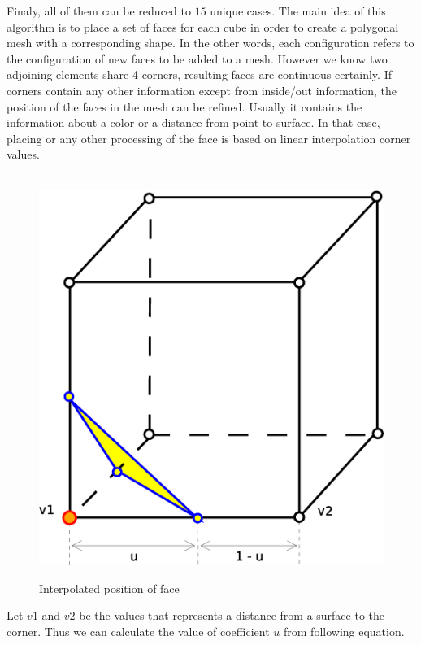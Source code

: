 Finaly, all of them can be reduced to $15$ unique cases. The main idea of this algorithm is to
place a set of faces for each cube in order to create a polygonal mesh with a corresponding shape.
In the other words, each configuration refers to the configuration of new faces to be added to a mesh.
However we know two adjoining elements share 4 corners, resulting faces are continuous certainly.
If corners contain any other information except from inside/out information, the position of 
the faces in the mesh can be refined. Usually it contains the information about a color or
a distance from point to surface. In that case, placing or any other processing of
the face is based on linear interpolation corner values.\\
\\

\begin{figure}[!htbp]
\centering
\includegraphics[scale=0.35]{../img/marc_cub_inter.eps}
\label{fig:mc_interpolation}
\caption{Interpolated position of face}
\end{figure}

Let $v1$ and $v2$ be the values that represents a distance from a surface to the corner.
Thus we can calculate the value of coefficient $u$ from following equation.

